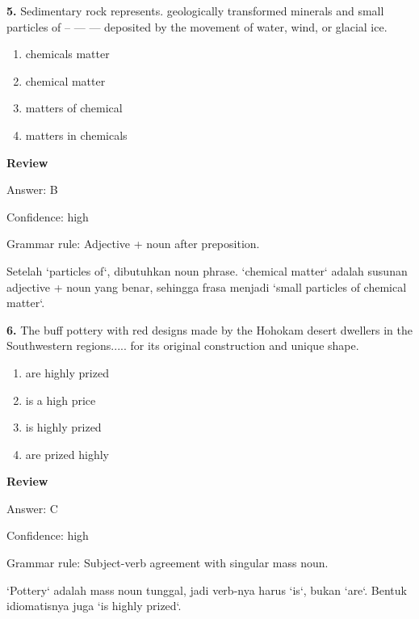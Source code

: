 \documentclass[12pt]{article}
\begin{document}
\endgroup
\par
\vspace{0.25\baselineskip}
\noindent\textbf{5.} Sedimentary rock represents. geologically transformed minerals and small particles of -- --- --- deposited by the movement of water, wind, or glacial ice.
\begin{enumerate}[label=(\Alph*),leftmargin=*,itemsep=0.2em]
\item chemicals matter
\item chemical matter
\item matters of chemical
\item matters in chemicals
\end{enumerate}
\par
\begingroup
\setlength{\parskip}{0pt}
\setlength{\parindent}{0pt}
\textbf{Review}\par
Answer: B\par
Confidence: high\par
Grammar rule: Adjective + noun after preposition.\par
Setelah `particles of`, dibutuhkan noun phrase. `chemical matter` adalah susunan adjective + noun yang benar, sehingga frasa menjadi `small particles of chemical matter`.\par
\endgroup
\par
\vspace{0.25\baselineskip}
\noindent\textbf{6.} The buff pottery with red designs made by the Hohokam desert dwellers in the Southwestern regions..... for its original construction and unique shape.
\begin{enumerate}[label=(\Alph*),leftmargin=*,itemsep=0.2em]
\item are highly prized
\item is a high price
\item is highly prized
\item are prized highly
\end{enumerate}
\par
\begingroup
\setlength{\parskip}{0pt}
\setlength{\parindent}{0pt}
\textbf{Review}\par
Answer: C\par
Confidence: high\par
Grammar rule: Subject-verb agreement with singular mass noun.\par
`Pottery` adalah mass noun tunggal, jadi verb-nya harus `is`, bukan `are`. Bentuk idiomatisnya juga `is highly prized`.\par
\endgroup
\par
\end{document}
